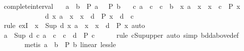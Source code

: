 \begin{isabellebody}
\isanewline
%
\endisadelimproof
\isanewline
{}\isamarkupfalse%
\ complete{\isacharunderscore}{\kern0pt}interval{\isacharcolon}{\kern0pt}\isanewline
\ \ \ {\isachardoublequoteopen}a\ {\isacharless}{\kern0pt}\ b{\isachardoublequoteclose}\ \ {\isachardoublequoteopen}P\ a{\isachardoublequoteclose}\ \ {\isachardoublequoteopen}{\isasymnot}\ P\ b{\isachardoublequoteclose}\isanewline
\ \ \ {\isachardoublequoteopen}{\isasymexists}c{\isachardot}{\kern0pt}\ a\ {\isasymle}\ c\ {\isasymand}\ c\ {\isasymle}\ b\ {\isasymand}\ {\isacharparenleft}{\kern0pt}{\isasymforall}x{\isachardot}{\kern0pt}\ a\ {\isasymle}\ x\ {\isasymand}\ x\ {\isacharless}{\kern0pt}\ c\ {\isasymlongrightarrow}\ P\ x{\isacharparenright}{\kern0pt}\ {\isasymand}\isanewline
\ \ \ \ \ \ \ \ \ \ \ \ \ {\isacharparenleft}{\kern0pt}{\isasymforall}d{\isachardot}{\kern0pt}\ {\isacharparenleft}{\kern0pt}{\isasymforall}x{\isachardot}{\kern0pt}\ a\ {\isasymle}\ x\ {\isasymand}\ x\ {\isacharless}{\kern0pt}\ d\ {\isasymlongrightarrow}\ P\ x{\isacharparenright}{\kern0pt}\ {\isasymlongrightarrow}\ d\ {\isasymle}\ c{\isacharparenright}{\kern0pt}{\isachardoublequoteclose}\isanewline
%
\isadelimproof
%
\endisadelimproof
%
\isatagproof
{}\isamarkupfalse%
\ {\isacharparenleft}{\kern0pt}rule\ exI\ {\isacharbrackleft}{\kern0pt}\ x\ {\isacharequal}{\kern0pt}\ {\isachardoublequoteopen}Sup\ {\isacharbraceleft}{\kern0pt}d{\isachardot}{\kern0pt}\ {\isasymforall}x{\isachardot}{\kern0pt}\ a\ {\isasymle}\ x\ {\isasymand}\ x\ {\isacharless}{\kern0pt}\ d\ {\isasymlongrightarrow}\ P\ x{\isacharbraceright}{\kern0pt}{\isachardoublequoteclose}{\isacharbrackright}{\kern0pt}{\isacharcomma}{\kern0pt}\ auto{\isacharparenright}{\kern0pt}\isanewline
\ \ \isamarkupfalse%
\ {\isachardoublequoteopen}a\ {\isasymle}\ Sup\ {\isacharbraceleft}{\kern0pt}d{\isachardot}{\kern0pt}\ {\isasymforall}c{\isachardot}{\kern0pt}\ a\ {\isasymle}\ c\ {\isasymand}\ c\ {\isacharless}{\kern0pt}\ d\ {\isasymlongrightarrow}\ P\ c{\isacharbraceright}{\kern0pt}{\isachardoublequoteclose}\isanewline
\ \ \ \ \isamarkupfalse%
\ {\isacharparenleft}{\kern0pt}rule\ cSup{\isacharunderscore}{\kern0pt}upper{\isacharcomma}{\kern0pt}\ auto\ simp{\isacharcolon}{\kern0pt}\ bdd{\isacharunderscore}{\kern0pt}above{\isacharunderscore}{\kern0pt}def{\isacharparenright}{\kern0pt}\isanewline
\ \ \ \ \ \ \ {\isacharparenleft}{\kern0pt}metis\ {\isacartoucheopen}a\ {\isacharless}{\kern0pt}\ b{\isacartoucheclose}\ {\isacartoucheopen}{\isasymnot}\ P\ b{\isacartoucheclose}\ linear\ less{\isacharunderscore}{\kern0pt}le{\isacharparenright}{\kern0pt}\isanewline

\end{isabellebody}
